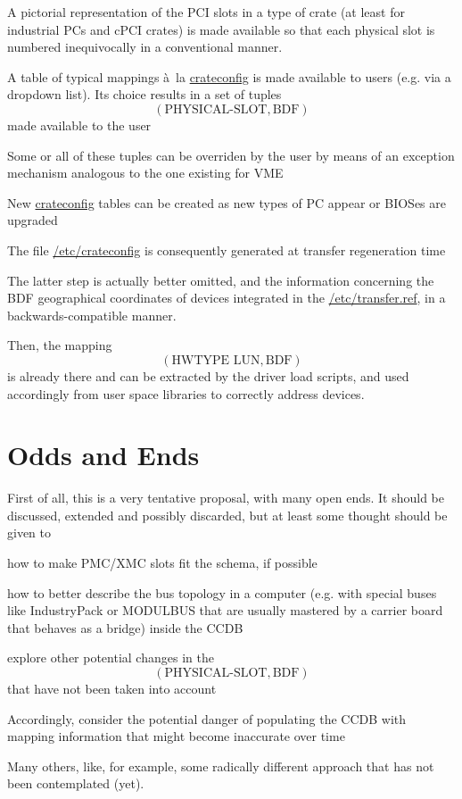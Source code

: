 \documentclass[12pt,a4paper]{article}
\begin{document}
\begin{compactitem}
\item
A pictorial representation of the PCI slots in a type of crate (at least
for industrial PCs and cPCI crates) is made available so that each
physical slot is numbered inequivocally in a conventional manner.
\item
A table of typical mappings \`a\ la \url{crateconfig} is made available
to users (e.g. via a dropdown list). Its choice results in a set of
tuples
\begin{equation*}
(\text{PHYSICAL-SLOT}, \text{BDF})
\end{equation*}
made available to the user
\item
Some or all of these tuples can be overriden by the user by means of an
exception mechanism analogous to the one existing for VME
\item
New \url{crateconfig} tables can be created as new types of PC appear or
BIOSes are upgraded
\item
The file \url{/etc/crateconfig} is consequently generated at transfer
regeneration time
\item The latter step is actually better omitted, and the information
concerning the BDF geographical coordinates of devices integrated in the
\url{/etc/transfer.ref}, in a backwards-compatible manner.
\item Then, the mapping
\begin{equation*}
(\text{HWTYPE LUN}, \text{BDF})
\end{equation*}
is already there and can be extracted by the driver load scripts, and
used accordingly from user space libraries to correctly address devices.
\end{compactitem}

\section{Odds and Ends}

First of all, this is a very tentative proposal, with many open ends. It
should be discussed, extended and possibly discarded, but at least some
thought should be given to
\begin{compactitem}
\item how to make PMC/XMC slots fit the schema, if possible
\item how to better describe the bus topology in a computer (e.g. with
special buses like IndustryPack or MODULBUS that are usually mastered by
a carrier board that behaves as a bridge) inside the CCDB
\item explore other potential changes in the
\begin{equation*}
(\text{PHYSICAL-SLOT}, \text{BDF})
\end{equation*}
that have not been taken into account
\item Accordingly, consider the potential danger of populating the CCDB
with mapping information that might become inaccurate over time
\item Many others, like, for example, some radically different approach
that has not been contemplated (yet).
\end{compactitem}
\end{document}
